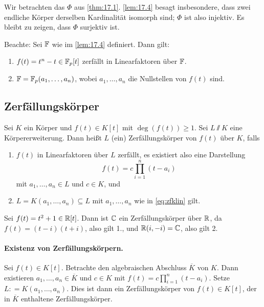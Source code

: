 \documentclass[12pt,a4paper]{scrartcl}
\begin{document}
\begin{bem}
	Wir betrachten das $\Phi$ aus \cref{thm:17.1}. \cref{lem:17.4} besagt insbesondere, dass zwei endliche Körper derselben Kardinalität isomorph sind; $\Phi$ ist also injektiv. Es bleibt zu zeigen, dass $\Phi$ surjektiv ist.
\end{bem}

\medskip

Beachte: Sei $\mathbb F$ wie im \cref{lem:17.4} definiert. Dann gilt:
\begin{enumerate}
	\item $f(t) = t^n-t\in\mathbb F_p[t]$ zerfällt in Linearfaktoren über $\mathbb F$.
	\item $\mathbb F= \mathbb F_p(a_1,\dots, a_n)$, wobei $a_1,\dots, a_n$ die Nullstellen von $f(t)$ sind.
\end{enumerate}

\subsection{Zerfällungskörper}
\begin{defi}
	Sei $K$ ein Körper und $f(t)\in K[t]$ mit $\deg(f(t))\geq 1$. Sei $L\sslash K$ eine Körpererweiterung. Dann heißt $L$ (ein) Zerfällungskörper von $f(t)$ über $K$, falls
	\begin{enumerate}
		\item $f(t)$ in Linearfaktoren über $L$ zerfällt, es existiert also eine Darstellung
		\begin{equation}
			f(t) = c\prod_{i = 1}^{n}(t-a_i) \tag{*} \label{eq:zfklin}
		\end{equation}
		mit $a_1,\dots,a_n \in L$ und $c\in K$, und
		\item $L = K(a_1,\dots, a_n)\subseteq L$ mit $a_1,\dots, a_n$ wie in \eqref{eq:zfklin} gilt.
	\end{enumerate}
\end{defi}
\begin{bsp}
	Sei $f(t) = t^2+1\in\mathbb R[t]$. Dann ist $\mathbb C$ ein Zerfällungskörper über $\mathbb R$, da $f(t) = (t-i)(t+i)$, also gilt 1., und $\mathbb R(i,-i) = \mathbb C$, also gilt 2.
\end{bsp}
\paragraph{Existenz von Zerfällungskörpern.} Sei $f(t) \in K[t]$. Betrachte den algebraischen Abschluss $\overline{K}$ von $K$. Dann existieren $a_1,\dots, a_n\in\overline{K}$ und $c\in K$ mit $f(t) = c\prod_{i = 1}^{n}(t-a_i)$. Setze $L: = K(a_1,\dots, a_n)$. Dies ist dann ein Zerfällungskörper von $f(t)\in K[t]$, der in $\overline{K}$ enthaltene Zerfällungskörper.
\end{document}
